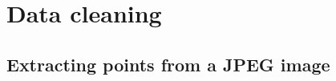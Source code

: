 \documentclass[../../ArchStats.tex]{subfiles}
\begin{document}
\section{Data cleaning}

\subsection{Extracting points from a JPEG image}
\end{document}
